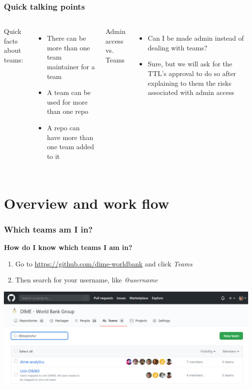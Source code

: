 \documentclass[aspectratio=169]{beamer} %
\begin{document}
\begin{frame}
	\frametitle{Quick talking points}
	
	\begin{columns}[c]
		
		Quick facts about teams:
		\begin{itemize}
			\item There can be more than one team maintainer for a team
			\item A team can be used for more than one repo
			\item A repo can have more than one team added to it
		\end{itemize}
		
		Admin access vs. Teams
		\begin{itemize}
			\item Can I be made admin instead of dealing with teams?
			\item Sure, but we will ask for the TTL's approval to do so after explaining to them the risks associated with admin access
		\end{itemize}	
		
	\end{columns}
\end{frame}


\section{Overview and work flow}

\begin{frame}
	\frametitle{Which teams am I in?}
	\textbf{How do I know which teams I am in?}
	\begin{enumerate}
		\item Go to \url{https://github.com/dime-worldbank} and click \textit{Teams}
		\item Then search for your username, like \textit{@username}
	\end{enumerate}
	\centering
	\includegraphics[width=.8\linewidth]{./img/which-teams-am-i-in}
\end{frame}
\end{document}
